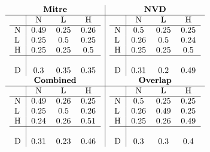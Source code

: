 \documentclass[11pt]{article}
\begin{document}
\begin{table}
	\centering
	\caption{Confusion matrices integrityImpact}
	\label{table:mitre-integrityImpact}
	\[
		\begin{array}{c|c}
			\textbf{Mitre}    & \textbf{NVD}     \\
			\hline
			\begin{tabular}{l|ccc}
				  & N    & L    & H    \\
				\hline
				N & 0.49 & 0.25 & 0.26 \\
				L & 0.25 & 0.5  & 0.25 \\
				H & 0.25 & 0.25 & 0.5  \\
				\hline                 \\
				D & 0.3  & 0.35 & 0.35 \\
			\end{tabular}
			                  &
			\begin{tabular}{l|ccc}
				  & N    & L    & H    \\
				\hline
				N & 0.5  & 0.25 & 0.25 \\
				L & 0.26 & 0.5  & 0.24 \\
				H & 0.25 & 0.25 & 0.5  \\
				\hline                 \\
				D & 0.31 & 0.2  & 0.49 \\
			\end{tabular}
			\\
			\textbf{Combined} & \textbf{Overlap} \\
			\hline
			\begin{tabular}{l|ccc}
				  & N    & L    & H    \\
				\hline
				N & 0.49 & 0.26 & 0.25 \\
				L & 0.25 & 0.5  & 0.26 \\
				H & 0.24 & 0.26 & 0.51 \\
				\hline                 \\
				D & 0.31 & 0.23 & 0.46 \\
			\end{tabular}
			                  &
			\begin{tabular}{l|ccc}
				  & N    & L    & H    \\
				\hline
				N & 0.5  & 0.25 & 0.25 \\
				L & 0.26 & 0.49 & 0.25 \\
				H & 0.25 & 0.26 & 0.49 \\
				\hline                 \\
				D & 0.3  & 0.3  & 0.4  \\
			\end{tabular}
		\end{array}
	\]
\end{table}
\end{document}

